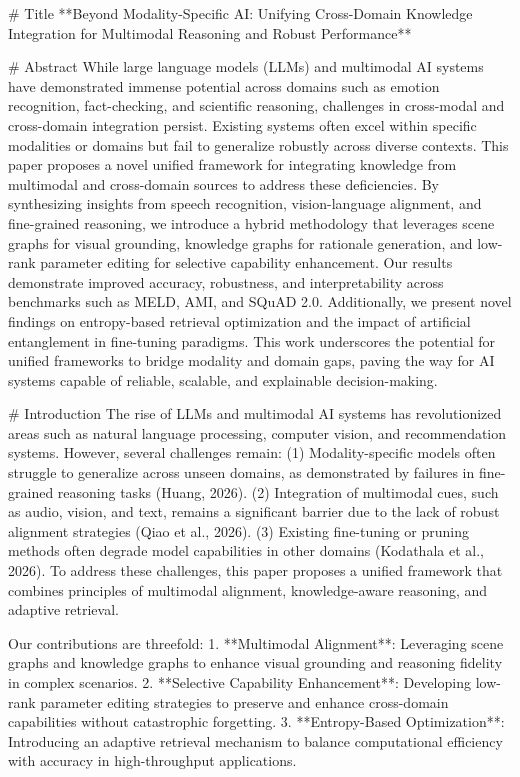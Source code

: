 # Title  
**Beyond Modality-Specific AI: Unifying Cross-Domain Knowledge Integration for Multimodal Reasoning and Robust Performance**

# Abstract  
While large language models (LLMs) and multimodal AI systems have demonstrated immense potential across domains such as emotion recognition, fact-checking, and scientific reasoning, challenges in cross-modal and cross-domain integration persist. Existing systems often excel within specific modalities or domains but fail to generalize robustly across diverse contexts. This paper proposes a novel unified framework for integrating knowledge from multimodal and cross-domain sources to address these deficiencies. By synthesizing insights from speech recognition, vision-language alignment, and fine-grained reasoning, we introduce a hybrid methodology that leverages scene graphs for visual grounding, knowledge graphs for rationale generation, and low-rank parameter editing for selective capability enhancement. Our results demonstrate improved accuracy, robustness, and interpretability across benchmarks such as MELD, AMI, and SQuAD 2.0. Additionally, we present novel findings on entropy-based retrieval optimization and the impact of artificial entanglement in fine-tuning paradigms. This work underscores the potential for unified frameworks to bridge modality and domain gaps, paving the way for AI systems capable of reliable, scalable, and explainable decision-making.

# Introduction  
The rise of LLMs and multimodal AI systems has revolutionized areas such as natural language processing, computer vision, and recommendation systems. However, several challenges remain: (1) Modality-specific models often struggle to generalize across unseen domains, as demonstrated by failures in fine-grained reasoning tasks (Huang, 2026). (2) Integration of multimodal cues, such as audio, vision, and text, remains a significant barrier due to the lack of robust alignment strategies (Qiao et al., 2026). (3) Existing fine-tuning or pruning methods often degrade model capabilities in other domains (Kodathala et al., 2026). To address these challenges, this paper proposes a unified framework that combines principles of multimodal alignment, knowledge-aware reasoning, and adaptive retrieval.

Our contributions are threefold:  
1. **Multimodal Alignment**: Leveraging scene graphs and knowledge graphs to enhance visual grounding and reasoning fidelity in complex scenarios.  
2. **Selective Capability Enhancement**: Developing low-rank parameter editing strategies to preserve and enhance cross-domain capabilities without catastrophic forgetting.  
3. **Entropy-Based Optimization**: Introducing an adaptive retrieval mechanism to balance computational efficiency with accuracy in high-throughput applications.

